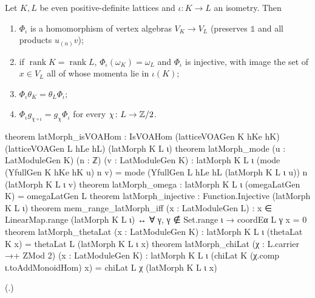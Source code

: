 \begin{theorem}[Functoriality]\label{ch03:thm:latMorph}
Let $K,L$ be even positive-definite lattices and $\iota\colon K\to L$ an isometry. Then
\begin{enumerate}[label=(\roman*)]
\item $\Phi_\iota$ is a homomorphism of vertex algebras $V_K\to V_L$ (preserves $\mathbb 1$ and all
  products $u_{(n)}v$);
\item if $\operatorname{rank}K=\operatorname{rank}L$, $\Phi_\iota(\omega_K)=\omega_L$ and $\Phi_\iota$
  is injective, with image the set of $x\in V_L$ all of whose momenta lie in $\iota(K)$;
\item $\Phi_\iota\theta_K=\theta_L\Phi_\iota$;
\item $\Phi_\iota g_{\chi\circ\iota}=g_\chi\Phi_\iota$ for every $\chi\colon L\to{\mathbb{Z}}/2$.
\end{enumerate}
\end{theorem}
\begin{leancode}
theorem latMorph_isVOAHom :
    IsVOAHom (latticeVOAGen K hKe hK) (latticeVOAGen L hLe hL) (latMorph K L ι)
theorem latMorph_mode (u : LatModuleGen K) (n : ℤ) (v : LatModuleGen K) :
    latMorph K L ι (mode (YfullGen K hKe hK u) n v)
      = mode (YfullGen L hLe hL (latMorph K L ι u)) n (latMorph K L ι v)
theorem latMorph_omega : latMorph K L ι (omegaLatGen K) = omegaLatGen L
theorem latMorph_injective : Function.Injective (latMorph K L ι)
theorem mem_range_latMorph_iff (x : LatModuleGen L) :
    x ∈ LinearMap.range (latMorph K L ι) ↔ ∀ γ, γ ∉ Set.range ι → coordEα L γ x = 0
theorem latMorph_thetaLat (x : LatModuleGen K) :
    latMorph K L ι (thetaLat K x) = thetaLat L (latMorph K L ι x)
theorem latMorph_chiLat (χ : L.carrier →+ ZMod 2) (x : LatModuleGen K) :
    latMorph K L ι (chiLat K (χ.comp ι.toAddMonoidHom) x) = chiLat L χ (latMorph K L ι x)
\end{leancode}
(.)

